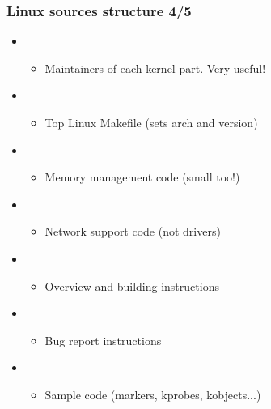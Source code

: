\begin{frame}
  \frametitle{Linux sources structure 4/5}
  \begin{itemize}
  \item {}
    \begin{itemize}
    \item Maintainers of each kernel part. Very useful!
    \end{itemize}
  \item {}
    \begin{itemize}
    \item Top Linux Makefile (sets arch and version)
    \end{itemize}
  \item {}
    \begin{itemize}
    \item Memory management code (small too!)
    \end{itemize}
  \item {}
    \begin{itemize}
    \item Network support code (not drivers)
    \end{itemize}
  \item {}
    \begin{itemize}
    \item Overview and building instructions
    \end{itemize}
  \item {}
    \begin{itemize}
    \item Bug report instructions
    \end{itemize}
  \item {}
    \begin{itemize}
    \item Sample code (markers, kprobes, kobjects...)
    \end{itemize}
  \end{itemize}
\end{frame}

